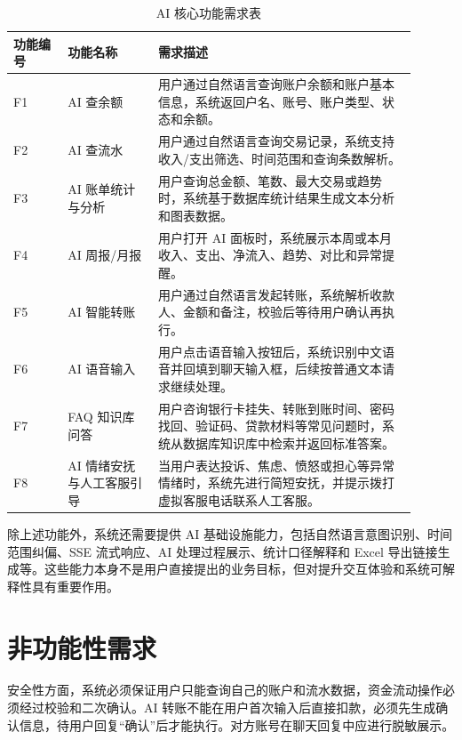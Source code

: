 \documentclass[bachelor, print]{xduthesis}
\begin{document}
\begin{table}[H]
    \centering
    \caption{AI 核心功能需求表}
    \label{tab:ai-requirements}
    \begin{tabular}{|p{0.12\linewidth}|p{0.2\linewidth}|p{0.58\linewidth}|}
        \hline
        功能编号 & 功能名称 & 需求描述 \\
        \hline
        F1 & AI 查余额 & 用户通过自然语言查询账户余额和账户基本信息，系统返回户名、账号、账户类型、状态和余额。 \\
        \hline
        F2 & AI 查流水 & 用户通过自然语言查询交易记录，系统支持收入/支出筛选、时间范围和查询条数解析。 \\
        \hline
        F3 & AI 账单统计与分析 & 用户查询总金额、笔数、最大交易或趋势时，系统基于数据库统计结果生成文本分析和图表数据。 \\
        \hline
        F4 & AI 周报/月报 & 用户打开 AI 面板时，系统展示本周或本月收入、支出、净流入、趋势、对比和异常提醒。 \\
        \hline
        F5 & AI 智能转账 & 用户通过自然语言发起转账，系统解析收款人、金额和备注，校验后等待用户确认再执行。 \\
        \hline
        F6 & AI 语音输入 & 用户点击语音输入按钮后，系统识别中文语音并回填到聊天输入框，后续按普通文本请求继续处理。 \\
        \hline
        F7 & FAQ 知识库问答 & 用户咨询银行卡挂失、转账到账时间、密码找回、验证码、贷款材料等常见问题时，系统从数据库知识库中检索并返回标准答案。 \\
        \hline
        F8 & AI 情绪安抚与人工客服引导 & 当用户表达投诉、焦虑、愤怒或担心等异常情绪时，系统先进行简短安抚，并提示拨打虚拟客服电话联系人工客服。 \\
        \hline
    \end{tabular}
\end{table}

除上述功能外，系统还需要提供 AI 基础设施能力，包括自然语言意图识别、时间范围纠偏、SSE 流式响应、AI 处理过程展示、统计口径解释和 Excel 导出链接生成等。这些能力本身不是用户直接提出的业务目标，但对提升交互体验和系统可解释性具有重要作用。

\section{非功能性需求}

安全性方面，系统必须保证用户只能查询自己的账户和流水数据，资金流动操作必须经过校验和二次确认。AI 转账不能在用户首次输入后直接扣款，必须先生成确认信息，待用户回复“确认”后才能执行。对方账号在聊天回复中应进行脱敏展示。
\end{document}
